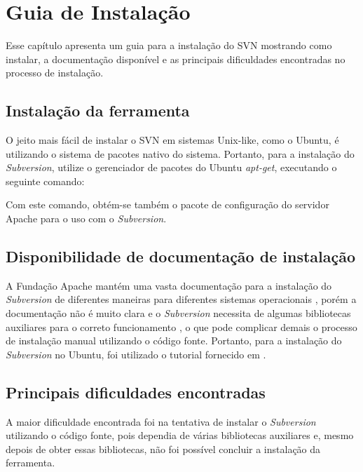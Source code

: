\chapter[Guia de Instalação]{Guia de Instalação}
  
  Esse capítulo apresenta um guia para a instalação do SVN mostrando como instalar, a documentação disponível e as
  principais dificuldades encontradas no processo de instalação.
    

\section{Instalação da ferramenta}
    
    O jeito mais fácil de instalar o SVN em sistemas Unix-like, como o Ubuntu,
    é utilizando o sistema de pacotes nativo do sistema. Portanto, para a instalação do \textit{Subversion},
    utilize o gerenciador de pacotes do Ubuntu \textit{apt-get}, executando o seguinte comando:
    
    \colorbox{Gray}{
      \begin{minipage}{0.6\linewidth}
      \end{minipage}
    }
    
    Com este comando, obtém-se também o pacote de configuração do servidor Apache para o uso com o \textit{Subversion}.
  
\section{Disponibilidade de documentação de instalação}
  
  A Fundação Apache mantém uma vasta documentação para a instalação do \textit{Subversion} de diferentes maneiras
  para diferentes sistemas operacionais \footnotemark, porém a documentação não é muito clara e o \textit{Subversion} necessita
  de algumas bibliotecas auxiliares para o correto funcionamento \cite{svn-book}, o que pode complicar demais o processo
  de instalação manual utilizando o código fonte. Portanto, para a instalação do \textit{Subversion} no Ubuntu, foi utilizado o
  tutorial fornecido em .
  
  
\section{Principais dificuldades encontradas}
  
  A maior dificuldade encontrada foi na tentativa de instalar o \textit{Subversion} utilizando o código fonte, pois dependia de 
  várias bibliotecas auxiliares e, mesmo depois de obter essas bibliotecas, não foi possível concluir a instalação da
  ferramenta.